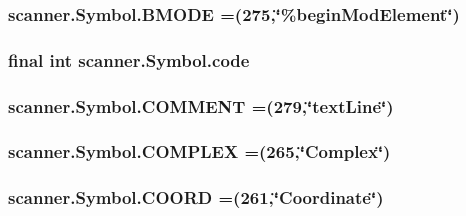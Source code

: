 \subsubsection[{\texorpdfstring{B\+M\+O\+DE}{BMODE}}]{\setlength{\rightskip}{0pt plus 5cm}scanner.\+Symbol.\+B\+M\+O\+DE =(275,\char`\"{}\%begin\+Mod\+Element\char`\"{})}\hypertarget{enumscanner_1_1Symbol_a317540ed6fa5dd2a2d88bd2330f7885e}{}\label{enumscanner_1_1Symbol_a317540ed6fa5dd2a2d88bd2330f7885e}
\subsubsection[{\texorpdfstring{code}{code}}]{\setlength{\rightskip}{0pt plus 5cm}final int scanner.\+Symbol.\+code\hspace{0.3cm}{\ttfamily [private]}}\hypertarget{enumscanner_1_1Symbol_acf9fa625e4d4be91bcb93f6edef7d119}{}\label{enumscanner_1_1Symbol_acf9fa625e4d4be91bcb93f6edef7d119}
\subsubsection[{\texorpdfstring{C\+O\+M\+M\+E\+NT}{COMMENT}}]{\setlength{\rightskip}{0pt plus 5cm}scanner.\+Symbol.\+C\+O\+M\+M\+E\+NT =(279,\char`\"{}text\+Line\char`\"{})}\hypertarget{enumscanner_1_1Symbol_a075212527a8bc8fba4907c4ba145107c}{}\label{enumscanner_1_1Symbol_a075212527a8bc8fba4907c4ba145107c}
\subsubsection[{\texorpdfstring{C\+O\+M\+P\+L\+EX}{COMPLEX}}]{\setlength{\rightskip}{0pt plus 5cm}scanner.\+Symbol.\+C\+O\+M\+P\+L\+EX =(265,\char`\"{}Complex\char`\"{})}\hypertarget{enumscanner_1_1Symbol_a3a17094f3037fbbbbeb7167b341f93d0}{}\label{enumscanner_1_1Symbol_a3a17094f3037fbbbbeb7167b341f93d0}
\subsubsection[{\texorpdfstring{C\+O\+O\+RD}{COORD}}]{\setlength{\rightskip}{0pt plus 5cm}scanner.\+Symbol.\+C\+O\+O\+RD =(261,\char`\"{}Coordinate\char`\"{})}\hypertarget{enumscanner_1_1Symbol_a4b0a4728ba24bbaa59681fc3846f4ccb}{}\label{enumscanner_1_1Symbol_a4b0a4728ba24bbaa59681fc3846f4ccb}
